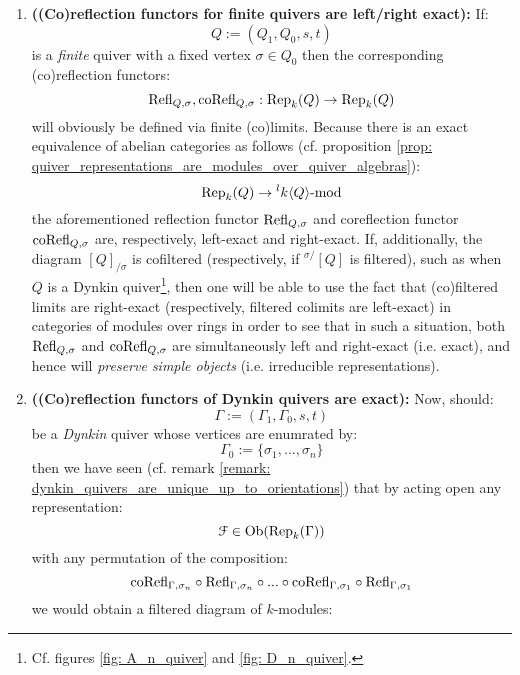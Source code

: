             \begin{remark} \label{remark: (co)reflection_functors_of_finite_quivers_are_exact}
                \noindent
                \begin{enumerate}
                    \item \textbf{((Co)reflection functors for finite quivers are left/right exact):} If:
                        $$Q := (Q_1, Q_0, s, t)$$
                    is a \textit{finite} quiver with a fixed vertex $\sigma \in Q_0$ then the corresponding (co)reflection functors:
                        $$\mathrm{Refl}_{Q, \sigma}, \mathrm{co}\mathrm{Refl}_{Q, \sigma}: \mathrm{Rep}_k(Q) \to \mathrm{Rep}_k(Q)$$
                    will obviously be defined via finite (co)limits. Because there is an exact equivalence of abelian categories as follows (cf. proposition \ref{prop: quiver_representations_are_modules_over_quiver_algebras}):
                        $$\mathrm{Rep}_k(Q) \to {}^lk\langle Q\rangle\text{-}\mathrm{mod}$$
                    the aforementioned reflection functor $\mathrm{Refl}_{Q, \sigma}$ and coreflection functor $\mathrm{co}\mathrm{Refl}_{Q, \sigma}$ are, respectively, left-exact and right-exact. If, additionally, the diagram $[Q]_{/\sigma}$ is cofiltered (respectively, if ${}^{\sigma/}[Q]$ is filtered), such as when $Q$ is a Dynkin quiver\footnote{Cf. figures \ref{fig: A_n_quiver} and \ref{fig: D_n_quiver}.}, then one will be able to use the fact that (co)filtered limits are right-exact (respectively, filtered colimits are left-exact) in categories of modules over rings in order to see that in such a situation, both $\mathrm{Refl}_{Q, \sigma}$ and $\mathrm{co}\mathrm{Refl}_{Q, \sigma}$ are simultaneously left and right-exact (i.e. exact), and hence will \textit{preserve simple objects} (i.e. irreducible representations).
                    \item \textbf{((Co)reflection functors of Dynkin quivers are exact):} Now, should:
                        $$\Gamma := (\Gamma_1, \Gamma_0, s, t)$$
                    be a \textit{Dynkin} quiver whose vertices are enumrated by:
                        $$\Gamma_0 := \{\sigma_1, ..., \sigma_n\}$$
                    then we have seen (cf. remark \ref{remark: dynkin_quivers_are_unique_up_to_orientations}) that by acting open any representation:
                        $$\mathcal{F} \in \mathrm{Ob}(\mathrm{Rep}_k(\Gamma))$$
                    with any permutation of the composition:
                        $$\mathrm{co}\mathrm{Refl}_{\Gamma, \sigma_n} \circ \mathrm{Refl}_{\Gamma, \sigma_n} \circ ... \circ \mathrm{co}\mathrm{Refl}_{\Gamma, \sigma_1} \circ \mathrm{Refl}_{\Gamma, \sigma_1}$$
                    we would obtain a filtered diagram of $k$-modules:

\end{enumerate}
\end{remark}
